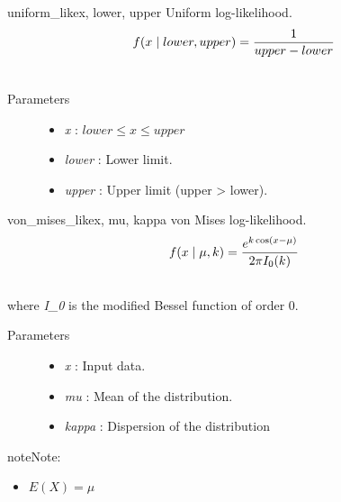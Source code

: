 \hypertarget{pymc.distributions.uniform_like}{}\begin{funcdesc}{uniform\_like}{x, lower, upper}
Uniform log-likelihood.
\begin{gather}
\begin{split}f(x \mid lower, upper) = \frac{1}{upper-lower}\end{split}\notag\\\begin{split}\end{split}\notag
\end{gather}\begin{description}
\item[Parameters] \leavevmode\begin{itemize}
\item {}
\emph{x} : $lower \leq x \leq upper$

\item {}
\emph{lower} : Lower limit.

\item {}
\emph{upper} : Upper limit (upper \textgreater{} lower).

\end{itemize}

\end{description}
\end{funcdesc}

\hypertarget{pymc.distributions.von_mises_like}{}\begin{funcdesc}{von\_mises\_like}{x, mu, kappa}
von Mises log-likelihood.
\begin{gather}
\begin{split}f(x \mid \mu, k) = \frac{e^{k \cos(x - \mu)}}{2 \pi I_0(k)}\end{split}\notag\\\begin{split}\end{split}\notag
\end{gather}
where \emph{I\_0} is the modified Bessel function of order 0.
\begin{description}
\item[Parameters] \leavevmode\begin{itemize}
\item {}
\emph{x} : Input data.

\item {}
\emph{mu} : Mean of the distribution.

\item {}
\emph{kappa} : Dispersion of the distribution

\end{itemize}

\end{description}

\begin{notice}{note}{Note:}\begin{itemize}
\item {}
$E(X) = \mu$

\end{itemize}
\end{notice}
\end{funcdesc}

